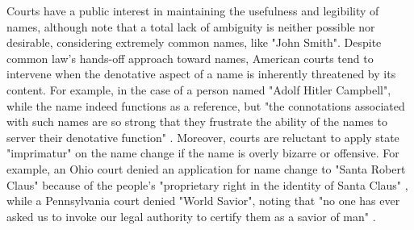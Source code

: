 Courts have a public interest in maintaining the usefulness and legibility of
names, although note that a total lack of ambiguity is neither possible nor
desirable, considering extremely common names, like "John Smith".  Despite
common law's hands-off approach toward names, American courts tend to intervene
when the denotative aspect of a name is inherently threatened by its content.
For example, in the case of a person named "Adolf Hitler Campbell", while the
name indeed functions as a reference, but "the connotations associated with
such names are so strong that they frustrate the ability of the names to server
their denotative function" \parencite[417]{heymann11}.  Moreover, courts are
reluctant to apply state "imprimatur" on the name change
\parencite[413]{heymann11} if the name is overly bizarre or offensive. For
example, an Ohio court denied an application for name change to "Santa Robert
Claus" because of the people's "proprietary right in the identity of Santa
Claus" \parencite[419]{heymann11} \parencite{handley00}, while a Pennsylvania
court denied "World Savior", noting that "no one has ever asked us to invoke
our legal authority to certify them as a savior of man"
\parencite[419]{heymann11} \parencite{bethea91}.
